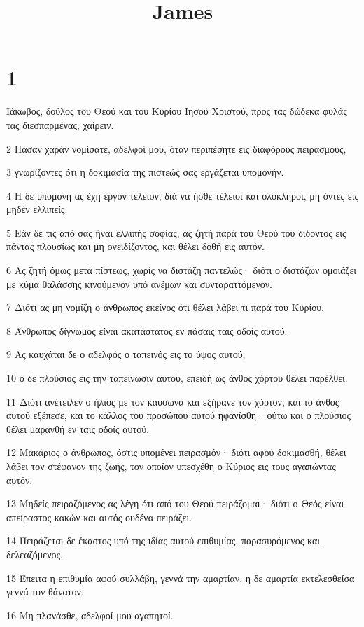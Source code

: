 

\title{James}


\chapter{1}

\par Ιάκωβος, δούλος του Θεού και του Κυρίου Ιησού Χριστού, προς τας δώδεκα φυλάς τας διεσπαρμένας, χαίρειν.
\par 2 Πάσαν χαράν νομίσατε, αδελφοί μου, όταν περιπέσητε εις διαφόρους πειρασμούς,
\par 3 γνωρίζοντες ότι η δοκιμασία της πίστεώς σας εργάζεται υπομονήν.
\par 4 Η δε υπομονή ας έχη έργον τέλειον, διά να ήσθε τέλειοι και ολόκληροι, μη όντες εις μηδέν ελλιπείς.
\par 5 Εάν δε τις από σας ήναι ελλιπής σοφίας, ας ζητή παρά του Θεού του δίδοντος εις πάντας πλουσίως και μη ονειδίζοντος, και θέλει δοθή εις αυτόν.
\par 6 Ας ζητή όμως μετά πίστεως, χωρίς να διστάζη παντελώς· διότι ο διστάζων ομοιάζει με κύμα θαλάσσης κινούμενον υπό ανέμων και συνταραττόμενον.
\par 7 Διότι ας μη νομίζη ο άνθρωπος εκείνος ότι θέλει λάβει τι παρά του Κυρίου.
\par 8 Άνθρωπος δίγνωμος είναι ακατάστατος εν πάσαις ταις οδοίς αυτού.
\par 9 Ας καυχάται δε ο αδελφός ο ταπεινός εις το ύψος αυτού,
\par 10 ο δε πλούσιος εις την ταπείνωσιν αυτού, επειδή ως άνθος χόρτου θέλει παρέλθει.
\par 11 Διότι ανέτειλεν ο ήλιος με τον καύσωνα και εξήρανε τον χόρτον, και το άνθος αυτού εξέπεσε, και το κάλλος του προσώπου αυτού ηφανίσθη· ούτω και ο πλούσιος θέλει μαρανθή εν ταις οδοίς αυτού.
\par 12 Μακάριος ο άνθρωπος, όστις υπομένει πειρασμόν· διότι αφού δοκιμασθή, θέλει λάβει τον στέφανον της ζωής, τον οποίον υπεσχέθη ο Κύριος εις τους αγαπώντας αυτόν.
\par 13 Μηδείς πειραζόμενος ας λέγη ότι από του Θεού πειράζομαι· διότι ο Θεός είναι απείραστος κακών και αυτός ουδένα πειράζει.
\par 14 Πειράζεται δε έκαστος υπό της ιδίας αυτού επιθυμίας, παρασυρόμενος και δελεαζόμενος.
\par 15 Έπειτα η επιθυμία αφού συλλάβη, γεννά την αμαρτίαν, η δε αμαρτία εκτελεσθείσα γεννά τον θάνατον.
\par 16 Μη πλανάσθε, αδελφοί μου αγαπητοί.
